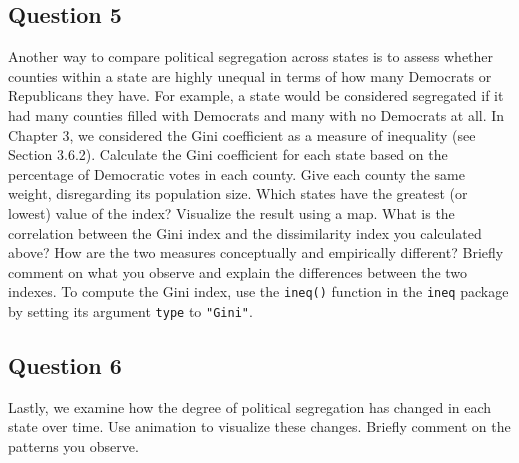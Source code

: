 \documentclass[]{article}
\begin{document}
\subsection{Question 5}\label{question-5}

Another way to compare political segregation across states is to assess
whether counties within a state are highly unequal in terms of how many
Democrats or Republicans they have. For example, a state would be
considered segregated if it had many counties filled with Democrats and
many with no Democrats at all. In Chapter 3, we considered the Gini
coefficient as a measure of inequality (see Section 3.6.2). Calculate
the Gini coefficient for each state based on the percentage of
Democratic votes in each county. Give each county the same weight,
disregarding its population size. Which states have the greatest (or
lowest) value of the index? Visualize the result using a map. What is
the correlation between the Gini index and the dissimilarity index you
calculated above? How are the two measures conceptually and empirically
different? Briefly comment on what you observe and explain the
differences between the two indexes. To compute the Gini index, use the
\texttt{ineq()} function in the \texttt{ineq} package by setting its
argument \texttt{type} to \texttt{"Gini"}.

\subsection{Question 6}\label{question-6}

Lastly, we examine how the degree of political segregation has changed
in each state over time. Use animation to visualize these changes.
Briefly comment on the patterns you observe.
\end{document}
